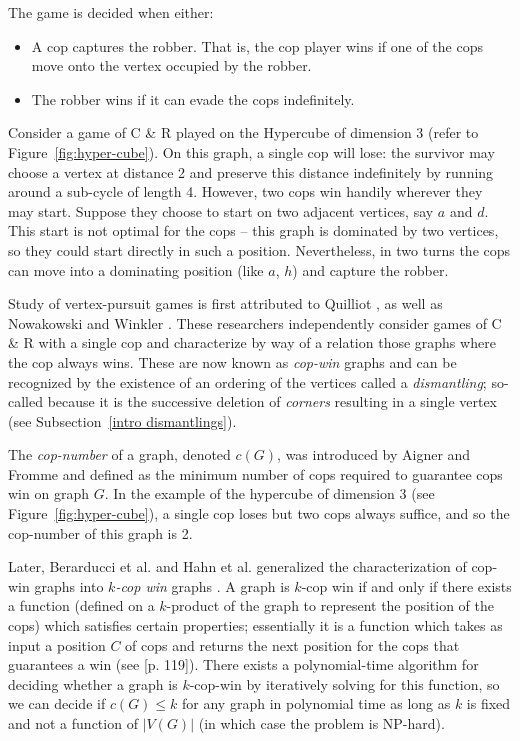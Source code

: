 The game is decided when either:
\begin{itemize}
\item A cop captures the robber. That is, the cop player wins if one of the cops move onto the vertex
occupied by the robber.
\item The robber wins if it can evade the cops indefinitely.
\end{itemize}

Consider a game of C \& R played on the Hypercube of dimension 3 (refer to Figure~\ref{fig:hyper-cube}). On this graph, a single cop will lose: the survivor may choose a vertex at distance 2 and preserve this distance indefinitely by running around a sub-cycle of length 4. However, two cops win handily wherever they may start. Suppose they choose to start on two adjacent vertices, say $a$ and $d$. This start is not optimal for the cops -- this graph is dominated by two vertices, so they could start directly in such a position. Nevertheless, in two turns the cops can move into a dominating position (like $a$, $h$) and capture the robber.

Study of vertex-pursuit games is first attributed to Quilliot \cite{quilliot1978jeux, quilliot1983problemes}, as well as Nowakowski and Winkler \cite{nowakowski1983vertex}.
These researchers independently consider games of C \& R with a single cop and characterize by way of a relation those graphs where the cop always wins. These are now known as \textit{cop-win} graphs
and can be recognized by the existence of an ordering of the vertices called a \textit{dismantling};
so-called because it is the successive deletion of \textit{corners} resulting in a single vertex (see Subsection~\ref{intro dismantlings}).

The \textit{cop-number} of a graph, denoted $c(G)$, was introduced by Aigner and Fromme  \cite{aigner1984game} and defined as the minimum number of cops required
to guarantee cops win on graph $G$. In the example of the hypercube of dimension 3 (see Figure~\ref{fig:hyper-cube}), a single cop loses but two cops always suffice, and so the cop-number of this graph is 2.

Later, Berarducci et al. and Hahn et al. generalized the characterization of cop-win graphs
into \textit{$k$-cop win} graphs \cite{berarducci1993cop, hahn2003characterisation}. A graph is $k$-cop win if and only if there exists a function (defined on a $k$-product of the graph to represent the position of the cops) which satisfies certain properties; essentially it is a function which takes as input a position $C$ of cops and returns the next position for the cops that guarantees a win (see \cite{bonato2011game}[p. 119]).
There exists a polynomial-time algorithm for deciding whether a graph is $k$-cop-win by iteratively
solving for this function, so we can decide if $c(G) \leq k$ for any graph in polynomial time as long as $k$ is fixed and not a function of $\lvert V(G) \rvert$ (in which case the problem is NP-hard).

